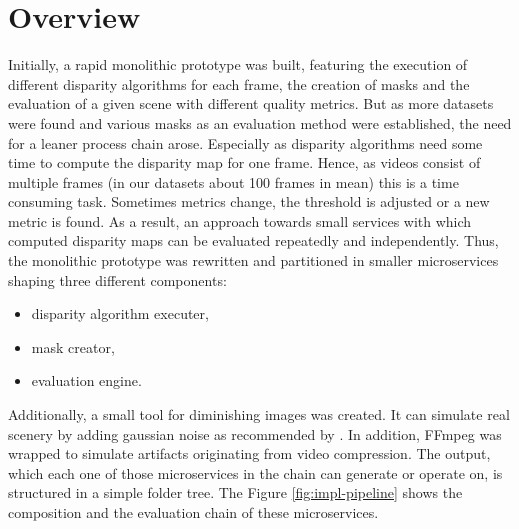 \section{Overview}

Initially, a rapid monolithic prototype was built, featuring the execution of different disparity algorithms for each frame, the creation of masks and the evaluation of a given scene with different quality metrics.
But as more datasets were found and various masks as an evaluation method were established, the need for a leaner process chain arose.
Especially as disparity algorithms need some time to compute the disparity map for one frame.
Hence, as videos consist of multiple frames (in our datasets about 100 frames in mean) this is a time consuming task.
Sometimes metrics change, the threshold is adjusted or a new metric is found.
\newline\newline\noindent As a result, an approach towards small services with which computed disparity maps can be evaluated repeatedly and independently.
Thus, the monolithic prototype was rewritten and partitioned in smaller microservices shaping three different components:

\begin{itemize}
  \item disparity algorithm executer,
  \item mask creator,
  \item evaluation engine.
\end{itemize}

\noindent Additionally, a small tool for diminishing images was created.
It can simulate real scenery by adding gaussian noise as recommended by \citep{richardt2010real}.
In addition, FFmpeg \citep{FFMPEG2010} was wrapped to simulate artifacts originating from video compression.
The output, which each one of those microservices in the chain can generate or operate on, is structured in a simple folder tree.
\newline\newline\noindent The Figure \ref{fig:impl-pipeline} shows the composition and the evaluation chain of these microservices.


